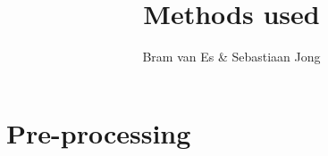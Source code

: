 \documentclass[a4paper,10pt]{article}
\title{Methods used}
\author{Bram van Es \& Sebastiaan Jong}
\begin{document}
\begin{abstract}

\end{abstract}




\section{Pre-processing}
\end{document}
